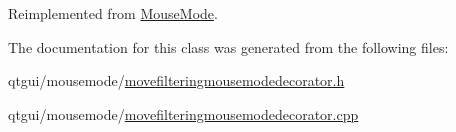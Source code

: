 Reimplemented from \mbox{\hyperlink{class_mouse_mode_acb2cde6c1de5c6e3ac065bcf45604c98}{Mouse\+Mode}}.



The documentation for this class was generated from the following files\+:\begin{DoxyCompactItemize}
\item 
qtgui/mousemode/\mbox{\hyperlink{movefilteringmousemodedecorator_8h}{movefilteringmousemodedecorator.\+h}}\item 
qtgui/mousemode/\mbox{\hyperlink{movefilteringmousemodedecorator_8cpp}{movefilteringmousemodedecorator.\+cpp}}\end{DoxyCompactItemize}
